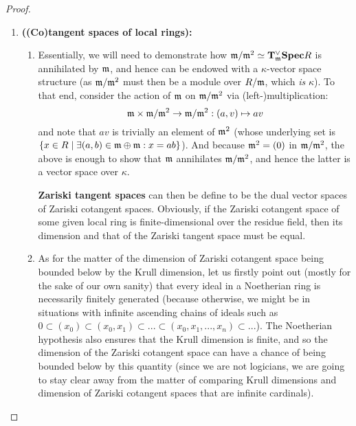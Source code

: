                 \begin{proof}
                    \noindent
                    \begin{enumerate}
                        \item \textbf{\textbf{((Co)tangent spaces of local rings):}} 
                            \begin{enumerate}
                                \item Essentially, we will need to demonstrate how $\mathfrak{m}/\mathfrak{m}^2 \simeq \mathbf{T}^{\vee}_{\mathfrak{m}}\mathbf{Spec} R$ is annihilated by $\mathfrak{m}$, and hence can be endowed with a $\kappa$-vector space structure (as $\mathfrak{m}/\mathfrak{m}^2$ must then be a module over $R/\mathfrak{m}$, which \textit{is} $\kappa$). To that end, consider the action of $\mathfrak{m}$ on $\mathfrak{m}/\mathfrak{m}^2$ via (left-)multiplication:
                                    $$\m \x \m/\m^2 \to \m/\m^2: (a, v) \mapsto av$$
                                and note that $av$ is trivially an element of $\mathfrak{m}^2$ (whose underlying set is $\{x \in R \mid \exists (a, b) \in \mathfrak{m} \oplus \mathfrak{m}: x = ab\}$). And because $\mathfrak{m}^2 = (0)$ in $\mathfrak{m}/\mathfrak{m}^2$, the above is enough to show that $\mathfrak{m}$ annihilates $\mathfrak{m}/\mathfrak{m}^2$, and hence the latter is a vector space over $\kappa$. 
                                
                                \textbf{Zariski tangent spaces} can then be define to be the dual vector spaces of Zariski cotangent spaces. Obviously, if the Zariski cotangent space of some given local ring is finite-dimensional over the residue field, then its dimension and that of the Zariski tangent space must be equal.
                                
                                \item As for the matter of the dimension of Zariski cotangent space being bounded below by the Krull dimension, let us firstly point out (mostly for the sake of our own sanity) that every ideal in a Noetherian ring is necessarily finitely generated (because otherwise, we might be in situations with infinite ascending chains of ideals such as $0 \subset (x_0) \subset (x_0, x_1) \subset ... \subset (x_0, x_1, ..., x_n) \subset ...$). The Noetherian hypothesis also ensures that the Krull dimension is finite, and so the dimension of the Zariski cotangent space can have a chance of being bounded below by this quantity (since we are not logicians, we are going to stay clear away from the matter of comparing Krull dimensions and dimension of Zariski cotangent spaces that are infinite cardinals).
                                

\end{enumerate}
\end{enumerate}
\end{proof}
